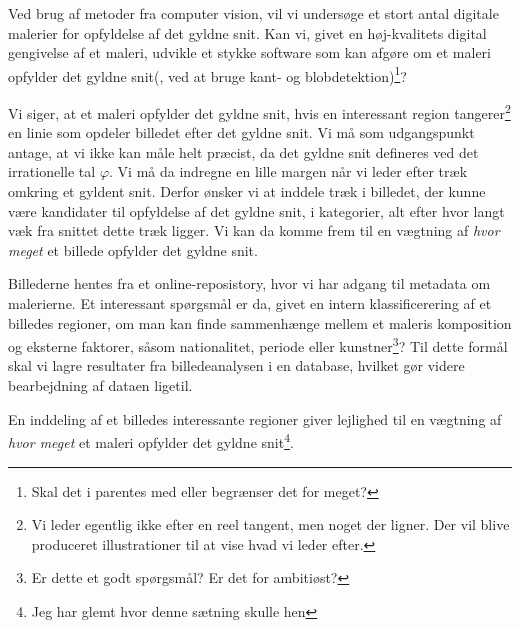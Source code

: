 Ved brug af metoder fra computer vision, vil vi undersøge et stort antal
digitale malerier for opfyldelse af det gyldne snit. Kan vi, givet en
høj-kvalitets digital gengivelse af et maleri, udvikle et stykke software som
kan afgøre om et maleri opfylder det gyldne snit(, ved at bruge kant- og
blobdetektion)\footnote{Skal det i parentes med eller begrænser det for
meget?}?

Vi siger, at et maleri opfylder det gyldne snit, hvis en interessant region
tangerer\footnote{Vi leder egentlig ikke efter en reel tangent, men noget der
ligner. Der vil blive produceret illustrationer til at vise hvad vi leder
efter.} en linie som opdeler billedet efter det gyldne snit. Vi må som
udgangspunkt antage, at vi ikke kan måle helt præcist, da det gyldne snit
defineres ved det irrationelle tal $\varphi$. Vi må da indregne en lille margen
når vi leder efter træk omkring et gyldent snit.  Derfor ønsker vi at inddele
træk i billedet, der kunne være kandidater til opfyldelse af det gyldne snit, i
kategorier, alt efter hvor langt væk fra snittet dette træk ligger. Vi kan da
komme frem til en vægtning af \emph{hvor meget} et billede opfylder det gyldne
snit.

Billederne hentes fra et online-reposistory, hvor vi har adgang til metadata om
malerierne. Et interessant spørgsmål er da, givet en intern klassificerering af
et billedes regioner, om man kan finde sammenhænge mellem et maleris
komposition og eksterne faktorer, såsom nationalitet, periode eller
kunstner\footnote{Er dette et godt spørgsmål? Er det for ambitiøst?}?  Til
dette formål skal vi lagre resultater fra billedeanalysen i en database,
hvilket gør videre bearbejdning af dataen ligetil.

En inddeling af et billedes interessante regioner giver lejlighed til en
vægtning af \emph{hvor meget} et maleri opfylder det gyldne
snit\footnote{Jeg har glemt hvor denne sætning skulle hen}.
